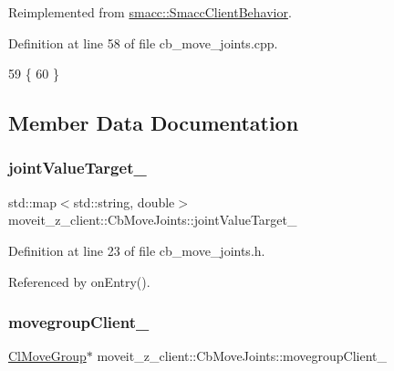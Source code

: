 Reimplemented from \hyperlink{classsmacc_1_1SmaccClientBehavior_ac0cd72d42bd00425362a97c9803ecce5}{smacc\+::\+Smacc\+Client\+Behavior}.



Definition at line 58 of file cb\+\_\+move\+\_\+joints.\+cpp.


\begin{DoxyCode}
59 \{
60 \}
\end{DoxyCode}


\subsection{Member Data Documentation}
\mbox{\label{classmoveit__z__client_1_1CbMoveJoints_a0f52577dd2fccf25f36c4c93e733c0f4}} 
\subsubsection{\texorpdfstring{joint\+Value\+Target\+\_\+}{jointValueTarget\_}}
{\footnotesize\ttfamily std\+::map$<$std\+::string, double$>$ moveit\+\_\+z\+\_\+client\+::\+Cb\+Move\+Joints\+::joint\+Value\+Target\+\_\+}



Definition at line 23 of file cb\+\_\+move\+\_\+joints.\+h.



Referenced by on\+Entry().

\mbox{\label{classmoveit__z__client_1_1CbMoveJoints_a2ce2e613b676025766dcd2f01ae50810}} 
\subsubsection{\texorpdfstring{movegroup\+Client\+\_\+}{movegroupClient\_}}
{\footnotesize\ttfamily \hyperlink{classmoveit__z__client_1_1ClMoveGroup}{Cl\+Move\+Group}$\ast$ moveit\+\_\+z\+\_\+client\+::\+Cb\+Move\+Joints\+::movegroup\+Client\+\_\+\hspace{0.3cm}{\ttfamily [protected]}}




